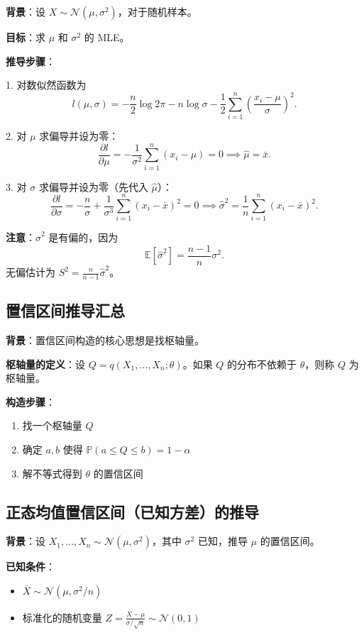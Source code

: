 \textbf{背景}：设 $X \sim \mathcal{N}(\mu, \sigma^2)$，对于随机样本。

\textbf{目标}：求 $\mu$ 和 $\sigma^2$ 的 MLE。

\textbf{推导步骤}：

1. 对数似然函数为
\[
l(\mu, \sigma) = -\frac{n}{2}\log 2\pi - n\log\sigma - \frac{1}{2}\sum_{i=1}^{n}\left(\frac{x_i-\mu}{\sigma}\right)^2.
\]

2. 对 $\mu$ 求偏导并设为零：
\[
\frac{\partial l}{\partial \mu} = -\frac{1}{\sigma^2}\sum_{i=1}^{n}(x_i - \mu) = 0 \implies \widehat{\mu} = \bar{x}.
\]

3. 对 $\sigma$ 求偏导并设为零（先代入 $\widehat{\mu}$）：
\[
\frac{\partial l}{\partial \sigma} = -\frac{n}{\sigma} + \frac{1}{\sigma^3}\sum_{i=1}^{n}(x_i - \bar{x})^2 = 0 \implies \widehat{\sigma}^2 = \frac{1}{n}\sum_{i=1}^{n}(x_i - \bar{x})^2.
\]

\textbf{注意}：$\widehat{\sigma}^2$ 是有偏的，因为
\[
\mathbb{E}[\widehat{\sigma}^2] = \frac{n-1}{n}\sigma^2.
\]
无偏估计为 $S^2 = \frac{n}{n-1}\widehat{\sigma}^2$。

\subsection{置信区间推导汇总}\label{sec:derivation-confidence-interval}

\textbf{背景}：置信区间构造的核心思想是找枢轴量。

\textbf{枢轴量的定义}：设 $Q = q(X_1, \ldots, X_n; \theta)$。如果 $Q$ 的分布不依赖于 $\theta$，则称 $Q$ 为枢轴量。

\textbf{构造步骤}：
\begin{enumerate}
\item 找一个枢轴量 $Q$
\item 确定 $a, b$ 使得 $\mathbb{P}(a \leq Q \leq b) = 1-\alpha$
\item 解不等式得到 $\theta$ 的置信区间
\end{enumerate}

\subsection{正态均值置信区间（已知方差）的推导}\label{sec:derivation-normal-ci-known}

\textbf{背景}：设 $X_1, \ldots, X_n \sim \mathcal{N}(\mu, \sigma^2)$，其中 $\sigma^2$ 已知，推导 $\mu$ 的置信区间。

\textbf{已知条件}：
\begin{itemize}
\item $\bar{X} \sim \mathcal{N}(\mu, \sigma^2/n)$
\item 标准化的随机变量 $Z = \frac{\bar{X} - \mu}{\sigma/\sqrt{n}} \sim \mathcal{N}(0,1)$
\end{itemize}

